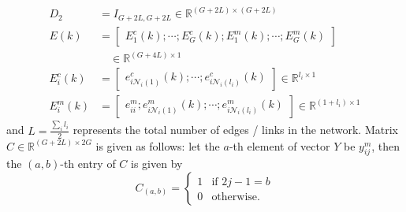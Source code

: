 \begin{equation}
\begin{aligned}
D_2 & = I_{G+2L, G+2L} \in \mathbb{R}^{(G+2L) \times (G+2L)} \\
E(k) &=  \begin{bmatrix} E^c_1(k); \cdots; E^c_G(k); E^m_1(k) ; \cdots;  E^m_G(k) \end{bmatrix} \\
& \quad\in \mathbb{R}^{(G+4L) \times 1} \\
E^c_i(k) & = \begin{bmatrix} e^c_{i\mathcal{N}_i(1)}(k); \cdots; e^c_{i\mathcal{N}_i(l_i)}(k) \end{bmatrix} \in \mathbb{R}^{l_i \times 1} \\
E^m_i(k) & = \begin{bmatrix} e^m_{ii}; e^m_{i\mathcal{N}_i(1)}(k); \cdots; e^m_{i\mathcal{N}_i(l_i)}(k) \end{bmatrix} \in \mathbb{R}^{(1+l_i) \times 1}
\end{aligned}\nonumber
\end{equation}
and $L = \frac{\sum_i l_i}{2}$ represents the total number of edges / links in the network. Matrix $C \in \mathbb{R}^{(G+2L)\times 2G}$ is given as follows: let the $a$-th element of vector $Y$ be $y^m_{ij}$, then the $(a,b)$-th entry of $C$ is given by
\begin{equation}
C_{(a,b)} = \begin{cases}1 & \mbox{if } 2j-1 = b \\ 0 & \mbox{otherwise.} \end{cases} \nonumber
\end{equation}

